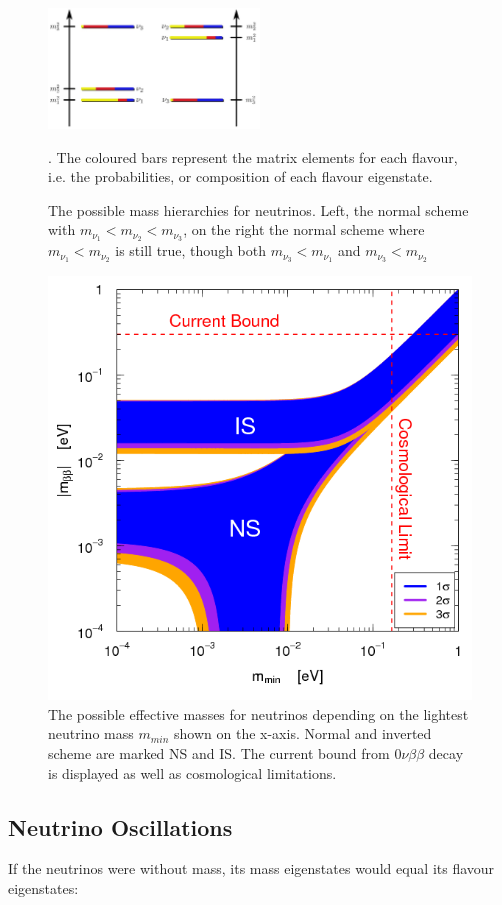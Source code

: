     \begin{figure}
    \centering
    \includegraphics[width=0.5\textwidth]{graphics/standardModel/massHierarchy.jpg}
    	 \caption[Neutrino mass hierarchy]{The possible mass hierarchies for neutrinos. Left, the normal scheme with $m_{\nu_1} < m_{\nu_2} < m_{\nu_3}$, on the right the normal scheme where $m_{\nu_1} < m_{\nu_2}$ is still true, though both $m_{\nu_3} < m_{\nu_1}$ and $m_{\nu_3} < m_{\nu_2}$ }. The coloured bars represent the matrix elements for each flavour, i.e. the probabilities, or composition of each flavour eigenstate.
    	\label{fig:massSchemes}
    \end{figure}
    \begin{figure}
    \centering
    \includegraphics[width = 0.5 \textwidth]{graphics/standardModel/massSchemes.png}
	\caption[Effective neutrino mass]{The possible effective masses for neutrinos depending on the lightest neutrino mass $m_{min}$ shown on the x-axis. Normal and inverted scheme are marked NS and IS. The current bound from $0\nu\beta\beta$ decay is displayed as well as cosmological limitations. }
    	\label{fig:massHierarchy}
    \end{figure}

    
    \subsection{Neutrino Oscillations}
    \label{ch:Introduction:sec:Massive neutrino:subsec:neutrino Oscillations}
      If the neutrinos were without mass, its mass eigenstates would equal its flavour eigenstates:
      
